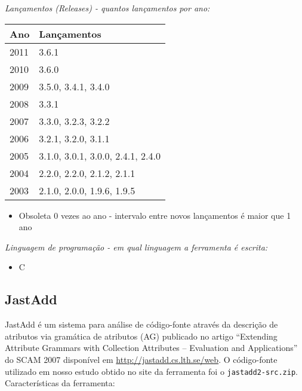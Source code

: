 \begin{description}

  \item {\it Lançamentos ({\it Releases}) - quantos lançamentos por ano:}
    \begin{table}[h!]
      \centering
      \begin{tabular}{| l | l |}
        \hline
        Ano  & Lançamentos                       \\
        \hline
        2011 & 3.6.1                             \\
        2010 & 3.6.0                             \\
        2009 & 3.5.0, 3.4.1, 3.4.0               \\
        2008 & 3.3.1                             \\
        2007 & 3.3.0, 3.2.3, 3.2.2               \\
        2006 & 3.2.1, 3.2.0, 3.1.1               \\
        2005 & 3.1.0, 3.0.1, 3.0.0, 2.4.1, 2.4.0 \\
        2004 & 2.2.0, 2.2.0, 2.1.2, 2.1.1        \\
        2003 & 2.1.0, 2.0.0, 1.9.6, 1.9.5        \\
        \hline
      \end{tabular}
    \end{table}
    \begin{itemize}
      \item Obsoleta $0$ vezes ao ano - intervalo entre novos lançamentos é maior que 1 ano
    \end{itemize}

  \item {\it Linguagem de programação - em qual linguagem a ferramenta é escrita:}
    \begin{itemize}
      \item C
    \end{itemize}

\end{description}

\subsection{JastAdd}

JastAdd é um sistema para análise de código-fonte através da descrição de
atributos via gramática de atributos (AG) publicado no artigo ``Extending
Attribute Grammars with Collection Attributes -- Evaluation and Applications''
do SCAM 2007 disponível em \url{http://jastadd.cs.lth.se/web}. O código-fonte
utilizado em nosso estudo obtido no site da ferramenta foi o
\texttt{jastadd2-src.zip}. Características da ferramenta:

